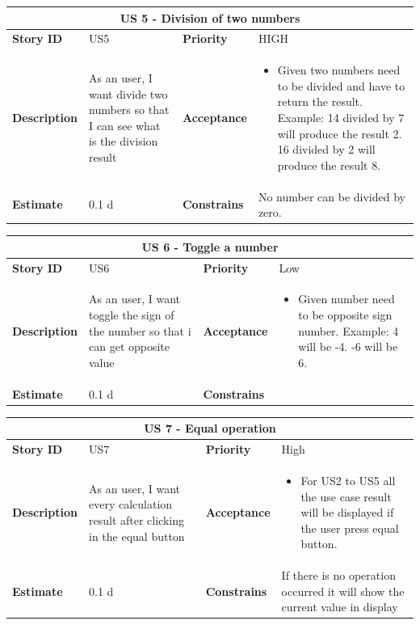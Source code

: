 \documentclass{article}
\begin{document}
\begin{tabular}{ |p{2cm}|p{5cm}|p{2cm}|p{4cm}| }
 \hline
 \multicolumn{4}{|c|}{US 5 - Division of two numbers} \\
 \hline
 \textbf {Story ID}& US5 &  \textbf{Priority} & HIGH \\
 \hline
  \textbf{Description}   & As an user, I want divide two numbers so that I can see what is the division result &    \textbf{Acceptance}& 
\begin{itemize}
\item Given two numbers need to be divided and have to return the result. Example: 14 divided by 7 will produce the result 2. 16 divided by 2 will produce the result 8. 
\end{itemize}
  \\
 \hline
 \textbf{Estimate} & 0.1 d &  \textbf{Constrains}&  No number can be divided by zero. \\
 \hline
\end{tabular}

\begin{tabular}{ |p{2cm}|p{5cm}|p{2cm}|p{4cm}| }
 \hline
 \multicolumn{4}{|c|}{US 6 - Toggle a number} \\
 \hline
 \textbf {Story ID}& US6 &  \textbf{Priority} & Low \\
 \hline
  \textbf{Description}   & As an user, I want toggle the sign of the number so that i can get opposite value &    \textbf{Acceptance}& 
\begin{itemize}
\item Given number need to be opposite sign number. Example: 4 will be -4.   -6 will be 6. 
\end{itemize}
  \\
 \hline
 \textbf{Estimate} & 0.1 d &  \textbf{Constrains}&   \\
 \hline
\end{tabular}

\begin{tabular}{ |p{2cm}|p{5cm}|p{2cm}|p{4cm}| }
 \hline
 \multicolumn{4}{|c|}{US 7 - Equal operation} \\
 \hline
 \textbf {Story ID}& US7 &  \textbf{Priority} & High \\
 \hline
  \textbf{Description}   & As an user, I want every calculation result after clicking in the equal button &    \textbf{Acceptance}& 
\begin{itemize}
\item For US2 to US5 all the use case result will be displayed if the user press equal button. 
\end{itemize}
  \\
 \hline
 \textbf{Estimate} & 0.1 d &  \textbf{Constrains}& If there is no operation occurred it will show the current value in display   \\
 \hline
\end{tabular}
\end{document}
